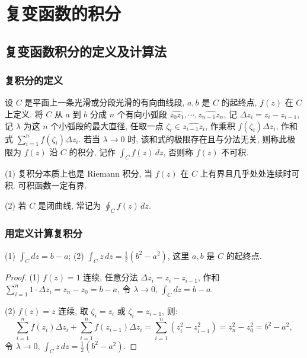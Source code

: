 \documentclass[theorem=false,mathfont=none,openany,sub3section]{easybook}
\begin{document}
\newpage

\chapter{复变函数的积分}

\section{复变函数积分的定义及计算法}

\subsection{复积分的定义}

\begin{definition}
  设 $C$ 是平面上一条光滑或分段光滑的有向曲线段, $a,b$ 是 $C$ 的起终点, $f(z)$ 在 $C$ 上定义. 将 $C$ 从 $a$ 到 $b$ 分成 $n$ 个有向小弧段 $\widehat{z_{0}z_{1}},\cdots,\widehat{z_{n-1}z_{n}}$, 记 $\Delta z_{i}=z_{i}-z_{i-1}$, 记 $\lambda$ 为这 $n$ 个小弧段的最大直径, 任取一点 $\zeta_{i}\in\widehat{z_{i-1}z_{i}}$, 作乘积 $f(\zeta_{i})\Delta z_{i}$, 作和式 $\sum_{i=1}^{n}f(\zeta_{i})\Delta z_{i}$. 若当 $\lambda\to0$ 时, 该和式的极限存在且与分法无关, 则称此极限为 $f(z)$ 沿 $C$ 的积分, 记作 $\int_{C}f(z)\,dz$, 否则称 $f(z)$ 不可积.
\end{definition}

\begin{remark}
  (1) 复积分本质上也是 Riemann 积分, 当 $f(z)$ 在 $C$ 上有界且几乎处处连续时可积. 可积函数一定有界.

  (2) 若 $C$ 是闭曲线, 常记为 $\oint_{C}f(z)\,dz$.
\end{remark}

\subsection{用定义计算复积分}

\begin{example}
  (1) $\int_{C}dz=b-a$; (2) $\int_{C}z\,dz=\frac{1}{2}(b^{2}-a^{2})$, 这里 $a,b$ 是 $C$ 的起终点.
  \begin{proof}
    (1) $f(z)=1$ 连续, 任意分法 $\Delta z_{i}=z_{i}-z_{i-1}$, 作和 $\sum_{i=1}^{n}1\cdot\Delta z_{i}=z_{n}-z_{0}=b-a$, 令 $\lambda\to0$, $\int_{C}dz=b-a$.

    (2) $f(z)=z$ 连续, 取 $\zeta_{i}=z_{i}$ 或 $\zeta_{i}=z_{i-1}$, 则:
    \[
    \sum_{i=1}^{n}f(z_{i})\Delta z_{i}+\sum_{i=1}^{n}f(z_{i-1})\Delta z_{i}
    =\sum_{i=1}^{n}(z_{i}^{2}-z_{i-1}^{2})=z_{n}^{2}-z_{0}^{2}=b^{2}-a^{2},
    \]
    令 $\lambda\to0$, $\int_{C}z\,dz=\frac{1}{2}(b^{2}-a^{2})$.
  \end{proof}
\end{example}
\end{document}
